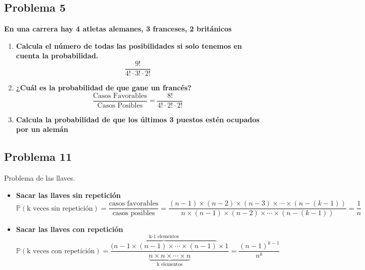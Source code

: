 \documentclass[11pt]{article}
\newcommand{\prob}{\mathbb{P}}
\theoremstyle{plain}
\begin{document}
        \subsection{Problema 5} %
        \label{sub:problema_5}
        \textbf{En una carrera hay 4 atletas alemanes, 3 franceses, 2 británicos}
        \begin{enumerate}[label=\Alph*]
            \item \textbf{Calcula el número de todas las posibilidades si solo tenemos en cuenta la probabilidad.} \[\frac{9!}{4! \cdot 3! \cdot 2!}\]
            \item \textbf{¿Cuál es la probabilidad de que gane un francés?} \[\frac{\text{Casos Favorables}}{\text{Casos Posibles}} = \frac{8!}{4!\cdot 2! \cdot 2!}\]
            \item \textbf{Calcula la probabilidad de que los últimos 3 puestos estén ocupados por un alemán}
        \end{enumerate}
        \subsection{Problema 11} %
        \label{sub:problema_11}
            Problema de las llaves.
            \begin{itemize}
                \item \textbf{Sacar las llaves sin repetición} \[\prob(\text{k veces sin repetición}) = \frac{\text{casos favorables}}{\text{casos posibles}} = \frac{(n-1)\times (n-2) \times (n-3) \times \cdots \times (n - (k -1))}{n \times (n-1) \times (n-2) \times \cdots \times (n-(k-1))} = \frac {1}{n}\]
                \item \textbf{Sacar las llaves con repetición}
                \[
                    \prob (\text{k veces con repetición}) = \frac{\overbrace{(n-1 \times (n-1) \times \cdots \times (n-1)}^{\text{k-1 elementos}}\times 1}{\underbrace{n\times n \times \cdots \times n}_{\text{k elementos}}} = \frac{(n-1)^{k-1}}{n^k}
                \]
            \end{itemize}
\end{document}

